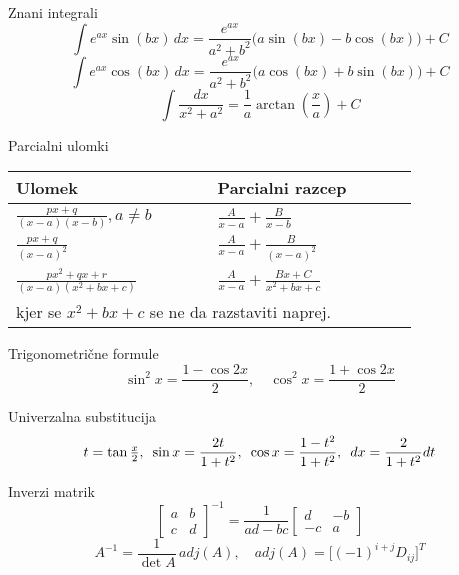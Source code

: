 \documentclass[a4paper,10pt]{article}
\begin{document}
\vspace*{5mm}
\begin{multicols}{2}


\begin{formulaBox}{Znani integrali}
\[
\int e^{ax}\sin(bx)\,dx = \frac{e^{ax}}{a^2+b^2}\big(a\sin(bx) - b\cos(bx)\big) + C
\]
\[
\int e^{ax}\cos(bx)\,dx = \frac{e^{ax}}{a^2+b^2}\big(a\cos(bx) + b\sin(bx)\big) + C
\]
\[
\int \frac{dx}{x^2+a^2} = \frac{1}{a}\arctan\!\left(\frac{x}{a}\right)+C
\]
\end{formulaBox}

\begin{formulaBox}{Parcialni ulomki}
	\\
\begin{tabular}{p{0.4\linewidth}p{0.4\linewidth}}
 Ulomek &  Parcialni razcep \\
\hline
$\displaystyle\frac{px+q}{(x-a)(x-b)}, a \ne b$ & $\displaystyle\frac{A}{x-a} + \frac{B}{x-b}$ \\[4mm]
$\displaystyle\frac{px+q}{(x-a)^2}$ & $\displaystyle\frac{A}{x-a} + \frac{B}{(x-a)^2}$ \\[4mm]
$\displaystyle\frac{px^2+qx+r}{(x-a)(x^2+bx+c)}$ & $\displaystyle\frac{A}{x-a} + \frac{Bx+C}{x^2+bx+c}$ \\[4mm]
\multicolumn{2}{p{\dimexpr.8\linewidth+4\tabcolsep\relax}}{%
    kjer se $x^2+bx+c$ se ne da razstaviti naprej.} \\
\end{tabular}
\end{formulaBox}

\begin{formulaBox}{Trigonometrične formule}
\[
\sin^2 x = \frac{1-\cos 2x}{2},\quad \cos^2 x = \frac{1+\cos 2x}{2}
\]
\end{formulaBox}

\begin{formulaBox}{Univerzalna substitucija}
\[t=\tan \tfrac{x}{2},\hspace{0.5em}
\sin x = \frac{2t}{1+t^2},\hspace{0.5em}
\cos x = \frac{1-t^2}{1+t^2},\hspace{0.5em}
dx=\frac{2}{1+t^2}dt
\]
\end{formulaBox}

\begin{formulaBox}{Inverzi matrik}
\[\begin{bmatrix}a&b\\c&d\end{bmatrix}^{-1}=\frac{1}{ad-bc}\begin{bmatrix}d&-b\\-c&a\end{bmatrix}
\]
\[
A^{-1} = \frac{1}{\det A}\,adj(A),\quad 
adj(A)=\big[(-1)^{i+j}D_{ij}\big]^T
\]
\end{formulaBox}


\end{multicols}
\end{document}
